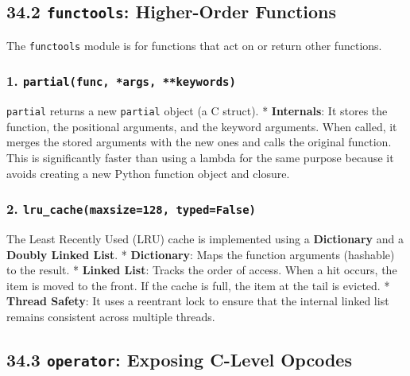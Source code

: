 \hypertarget{functools-higher-order-functions}{%
\subsection{\texorpdfstring{34.2 \texttt{functools}: Higher-Order
Functions}{34.2 functools: Higher-Order Functions}}\label{functools-higher-order-functions}}

The \passthrough{\lstinline!functools!} module is for functions that act
on or return other functions.

\hypertarget{partialfunc-args-keywords}{%
\subsubsection{\texorpdfstring{1.
\texttt{partial(func,\ *args,\ **keywords)}}{1. partial(func, *args, **keywords)}}\label{partialfunc-args-keywords}}

\passthrough{\lstinline!partial!} returns a new
\passthrough{\lstinline!partial!} object (a C struct). *
\textbf{Internals}: It stores the function, the positional arguments,
and the keyword arguments. When called, it merges the stored arguments
with the new ones and calls the original function. This is significantly
faster than using a lambda for the same purpose because it avoids
creating a new Python function object and closure.

\hypertarget{lru_cachemaxsize128-typedfalse}{%
\subsubsection{\texorpdfstring{2.
\texttt{lru\_cache(maxsize=128,\ typed=False)}}{2. lru\_cache(maxsize=128, typed=False)}}\label{lru_cachemaxsize128-typedfalse}}

The Least Recently Used (LRU) cache is implemented using a
\textbf{Dictionary} and a \textbf{Doubly Linked List}. *
\textbf{Dictionary}: Maps the function arguments (hashable) to the
result. * \textbf{Linked List}: Tracks the order of access. When a hit
occurs, the item is moved to the front. If the cache is full, the item
at the tail is evicted. * \textbf{Thread Safety}: It uses a reentrant
lock to ensure that the internal linked list remains consistent across
multiple threads.

\hypertarget{operator-exposing-c-level-opcodes}{%
\subsection{\texorpdfstring{34.3 \texttt{operator}: Exposing C-Level
Opcodes}{34.3 operator: Exposing C-Level Opcodes}}\label{operator-exposing-c-level-opcodes}}

